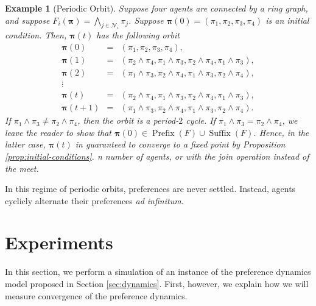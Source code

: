 \documentclass[conference]{ieeeconf}
\newcommand{\N}{\mathcal{N}}
\newcommand{\profile}{\boldsymbol{\pi}}
\newcommand{\meet}{\wedge}
\newcommand{\bigmeet}{\bigwedge}
\DeclareMathOperator{\Pre}{Prefix}
\DeclareMathOperator{\Post}{Suffix}
\newtheorem{example}{Example}
\begin{document}
\begin{example}[Periodic Orbit]
    Suppose four agents are connected by a ring graph, and suppose $F_i(\profile) = \bigmeet_{j \in \N_i} \pi_j$. Suppose $\profile(0) = (\pi_1,\pi_2,\pi_3,\pi_4)$ is an initial condition. Then, $\profile(t)$ has the following orbit
    \begin{align*}
        \profile(0) &=& \left( \pi_1,\pi_2,\pi_3,\pi_4 \right), \\
        \profile(1) &=& \left( \pi_2 \meet \pi_4, \pi_1 \meet \pi_3, \pi_2 \meet \pi_4, \pi_1 \meet \pi_3 \right), \\
        \profile(2) &=& \left( \pi_1 \meet \pi_3, \pi_2 \meet \pi_4, \pi_1 \meet \pi_3, \pi_2 \meet \pi_4 \right), \\
        \vdots &&  \\
        \profile(t) &=& \left( \pi_2 \meet \pi_4, \pi_1 \meet \pi_3, \pi_2 \meet \pi_4, \pi_1 \meet \pi_3 \right), \\
        \profile(t+1) &=& \left( \pi_1 \meet \pi_3, \pi_2 \meet \pi_4, \pi_1 \meet \pi_3, \pi_2 \meet \pi_4 \right).
    \end{align*}
    If $\pi_1 \meet \pi_3 \neq \pi_2 \meet \pi_4$, then the orbit is a period-$2$ cycle. If $\pi_1 \meet \pi_3 = \pi_2 \meet \pi_4$, we leave the reader to show that $\profile(0) \in \Pre(F) \cup \Post(F)$. Hence, in the latter case, $\profile(t)$ in guaranteed to converge to a fixed point by Proposition \ref{prop:initial-conditions}. n number of agents, or with the join operation instead of the meet.
\end{example}

In this regime of periodic orbits, preferences are never settled. Instead, agents cyclicly alternate their preferences \emph{ad infinitum}. 


\section{Experiments}
\label{sec:experiments}

In this section, we perform a simulation of an instance of the preference dynamics model proposed in Section \ref{sec:dynamics}. First, however, we explain how we will measure convergence of the preference dynamics.
\end{document}

